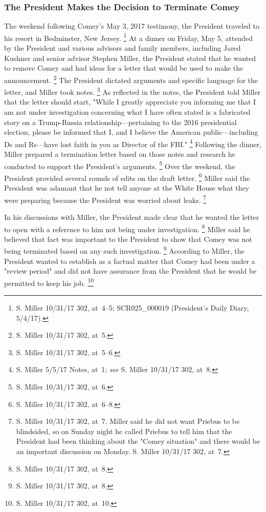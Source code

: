 {\subsubsection{The President Makes the Decision to Terminate Comey}

The weekend following Comey's May 3, 2017 testimony, the President traveled to his resort in Bedminster, New Jersey.%
\footnote{S. Miller 10/31/17 302, at~4--5;
SCR025\_000019 (President's Daily Diary, 5/4/17).}
At a dinner on Friday, May 5, attended by the President and various advisors and family members, including Jared Kushner and senior advisor Stephen Miller, the President stated that he wanted to remove Comey and had ideas for a letter that would be used to make the announcement.%
\footnote{S. Miller 10/31/17 302, at~5.}
The President dictated arguments and specific language for the letter, and Miller took notes.%
\footnote{S. Miller 10/31/17 302, at~5--6.}
As reflected in the notes, the President told Miller that the letter should start, "While I greatly appreciate you informing me that I am not under investigation concerning what I have often stated is a fabricated story on a Trump-Russia relationship---pertaining to the 2016 presidential election, please be informed that I, and I believe the American public---including Ds and Rs---have lost faith in you as Director of the FBI."%
\footnote{S. Miller 5/5/17 Notes, at~1;
\textit{see} S. Miller 10/31/17 302, at~8.}
Following the dinner, Miller prepared a termination letter based on those notes and research he conducted to support the President's arguments.%
\footnote{S. Miller 10/31/17 302, at~6.}
Over the weekend, the President provided several rounds of edits on the draft letter.%
\footnote{S. Miller 10/31/17 302, at~6--8.}
Miller said the President was adamant that he not tell anyone at the White House what they were preparing because the President was worried about leaks.%
\footnote{S. Miller 10/31/17 302, at~7.
Miller said he did not want Priebus to be blindsided, so on Sunday night he called Priebus to tell him that the President had been thinking about the "Comey situation" and there would be an important discussion on Monday.
S. Miller 10/31/17 302, at~7.}

In his discussions with Miller, the President made clear that he wanted the letter to open with a reference to him not being under investigation.%
\footnote{S. Miller 10/31/17 302, at~8.}
Miller said he believed that fact was important to the President to show that Comey was not being terminated based on any such investigation.%
\footnote{S. Miller 10/31/17 302, at~8.}
According to Miller, the President wanted to establish as a factual matter that Comey had been under a "review period" and did not have assurance from the President that he would be permitted to keep his job.%
\footnote{S. Miller 10/31/17 302, at~10.}

}
